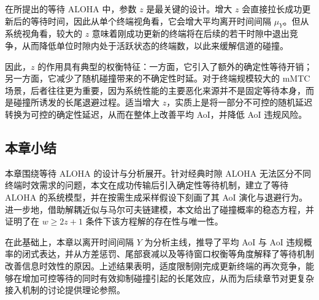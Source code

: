 在所提出的等待 ALOHA 中，参数 $z$ 是最关键的设计。增大 $z$ 会直接拉长成功更新后的等待时间，因此从单个终端视角看，它会增大平均离开时间间隔 $\mu_Y$。但从系统视角看，较大的 $z$ 意味着刚成功更新的终端将在后续的若干时隙中退出竞争，从而降低单位时隙内处于活跃状态的终端数，以此来缓解信道的碰撞。

因此，$z$ 的作用具有典型的权衡特征：一方面，它引入了额外的确定性等待开销；另一方面，它减少了随机碰撞带来的不确定性时延。对于终端规模较大的 mMTC 场景，后者往往更为重要，因为系统性能的主要恶化来源并不是固定等待本身，而是碰撞所诱发的长尾退避过程。适当增大 $z$，实质上是将一部分不可控的随机延迟转换为可控的确定性延迟，从而在整体上改善平均 AoI，并降低 AoI 违规风险。

\subsection{本章小结}

本章围绕等待 ALOHA 的设计与分析展开。针对经典时隙 ALOHA 无法区分不同终端时效需求的问题，本文在成功传输后引入确定性等待机制，建立了等待 ALOHA 的系统模型，并在按需生成采样假设下刻画了其 AoI 演化与退避行为。进一步地，借助解耦近似与马尔可夫链建模，本文给出了碰撞概率的稳态方程，并证明了在 $w\ge 2z+1$ 条件下该方程解的存在性与唯一性。

在此基础上，本章以离开时间间隔 $Y$ 为分析主线，推导了平均 AoI 与 AoI 违规概率的闭式表达，并从方差惩罚、尾部衰减以及等待窗口权衡等角度解释了等待机制改善信息时效性的原因。上述结果表明，适度限制刚完成更新终端的再次竞争，能够在增加可控等待的同时有效抑制碰撞引起的长尾效应，从而为后续章节对更复杂接入机制的讨论提供理论参照。

